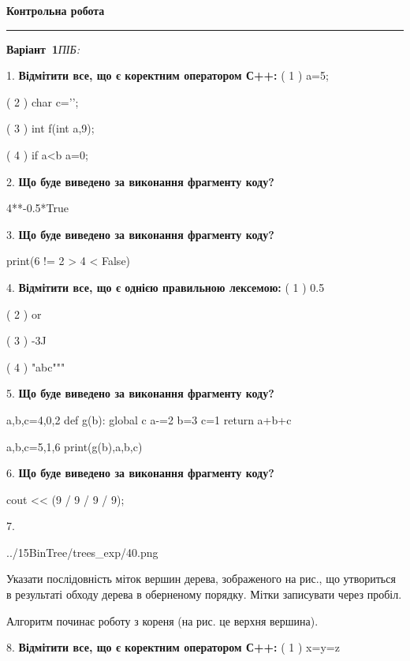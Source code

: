 \documentclass[11pt]{article}
\begin{document}
{\centering\Large\bfseries Контрольна робота\par}
\medskip
\noindent\rule{\linewidth}{0.5pt}
\smallskip
\noindent\textbf{Варіант \No\,1}\hfill \textit{ПІБ:}\,\underline{\hspace{60mm}}
\vspace{4mm}

1. %
\textbf{Відмітити все, що є коректним оператором С++:}
( 1 ) {a=5;}

( 2 ) char c='\n';

( 3 ) int f(int a,9);

( 4 ) if a<b a=0;
\par\vspace{5mm}
2. \textbf{Що буде виведено за виконання фрагменту коду?}

4**-0.5*True
\par\vspace{5mm}
3. \textbf{Що буде виведено за виконання фрагменту коду?}

print(6 != 2 > 4 < False)
\par\vspace{5mm}
4. %
\textbf{Відмітити все, що є однією правильною лексемою:}
( 1 ) 0.5

( 2 ) or

( 3 ) -3J

( 4 ) "abc"""
\par\vspace{5mm}
5. \textbf{Що буде виведено за виконання фрагменту коду?}

a,b,c=4,0,2
def g(b):
global c    a-=2
    b=3
    c=1
    return a+b+c

a,b,c=5,1,6
print(g(b),a,b,c)
\par\vspace{5mm}
6. \textbf{Що буде виведено за виконання фрагменту коду?}

cout << (9 / 9 / 9 / 9);
\par\vspace{5mm}
7. 

\begin{center}
	{../15BinTree/trees_exp/40.png}
\end{center}
Указати послідовність міток вершин дерева, зображеного на рис., що утвориться в результаті обходу дерева в оберненому порядку. Мітки записувати через пробіл.\par Алгоритм починає роботу з кореня (на рис. це верхня вершина).
\par\vspace{5mm}
8. %
\textbf{Відмітити все, що є коректним оператором С++:}
( 1 ) x=y=z
\end{document}
